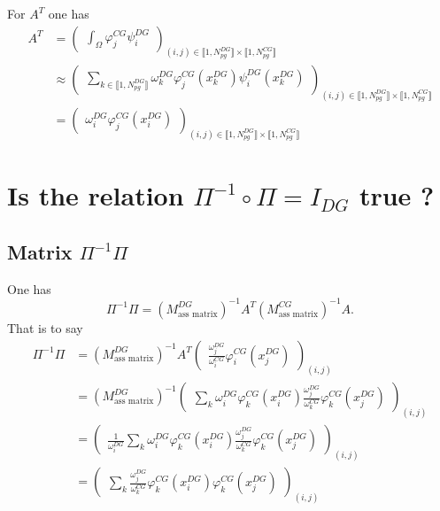 \documentclass[a4paper, 11pt]{report}
\begin{document}
For $A^{T}$ one has
\begin{equation*}
\begin{split}
A^{T}&=\begin{pmatrix}\int_{\Omega}\varphi_j^{CG}\psi_i^{DG}\end{pmatrix}_{(i,j)\in \llbracket 1, N_{pg}^{DG}\rrbracket \times\llbracket 1, N_{pg}^{CG}\rrbracket}
\\
&\approx \begin{pmatrix}\displaystyle\sum_{k\in\llbracket 1,N_{pg}^{DG}\rrbracket}\omega_{k}^{DG}\varphi_j^{CG}(x_k^{DG})\psi_i^{DG}(x_k^{DG}) \end{pmatrix}_{(i,j)\in \llbracket 1, N_{pg}^{DG}\rrbracket \times\llbracket 1, N_{pg}^{CG}\rrbracket}\\
&=\begin{pmatrix}\omega_i^{DG}\varphi_j^{CG}(x_i^{DG})\end{pmatrix}_{(i,j)\in \llbracket 1, N_{pg}^{DG}\rrbracket \times\llbracket 1, N_{pg}^{CG}\rrbracket}
\end{split}
\end{equation*}



\section{Is the relation $\Pi^{-1}\circ \Pi=I_{DG}$ true ?}
\subsection{Matrix $\Pi^{-1}\Pi$}
One has
\begin{equation*}
\Pi^{-1}\Pi=\left(M_{\text{ass matrix}}^{DG}\right)^{-1}A^{T}\left(M_{\text{ass matrix}}^{CG}\right)^{-1}A.
\end{equation*}
That is to say
\begin{equation*}
\begin{split}
\Pi^{-1}\Pi&=\left(M_{\text{ass matrix}}^{DG}\right)^{-1}A^{T}\begin{pmatrix}\frac{\omega_j^{DG}}{\omega_i^{CG}}\varphi_i^{CG}(x_j^{DG})\end{pmatrix}_{(i,j)}\\
&=\left(M_{\text{ass matrix}}^{DG}\right)^{-1}\begin{pmatrix}\sum_k \omega_i^{DG}\varphi_k^{CG}(x_i^{DG})\frac{\omega_j^{DG}}{\omega_k^{CG}}\varphi_k^{CG}(x_j^{DG})\end{pmatrix}_{(i,j)}\\
&=\begin{pmatrix}\frac{1}{\omega_i^{DG}}\displaystyle \sum_k \omega_i^{DG}\varphi_k^{CG}(x_i^{DG})\frac{\omega_j^{DG}}{\omega_k^{CG}}\varphi_k^{CG}(x_j^{DG})\end{pmatrix}_{(i,j)}\\
&=\begin{pmatrix}\displaystyle\sum_k \frac{\omega_j^{DG}}{\omega_k^{CG}}\varphi_k^{CG}(x_i^{DG})\varphi_k^{CG}(x_j^{DG})\end{pmatrix}_{(i,j)}
\end{split}
\end{equation*}
\end{document}
